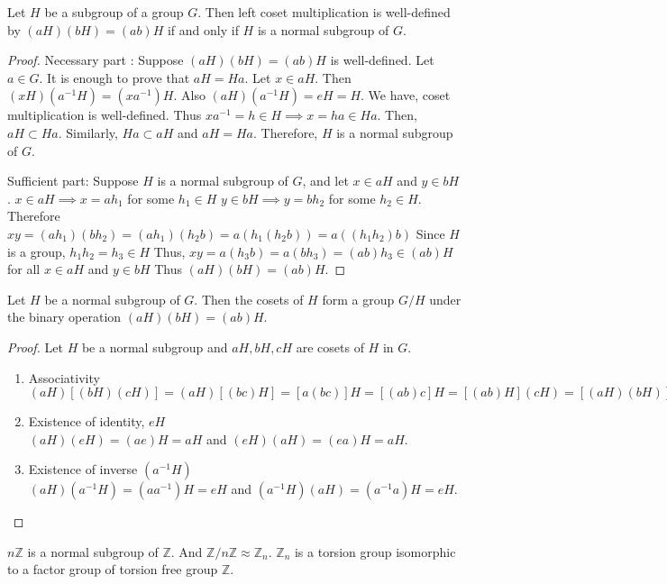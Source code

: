 \begin{theorem}
	Let $H$ be a subgroup of a group $G$.
	Then left coset multiplication is well-defined by $(aH)(bH) = (ab)H$ if and only if $H$ is a normal subgroup of $G$.
\end{theorem}
\begin{proof}
	Necessary part :
	Suppose $(aH)(bH) = (ab)H$ is well-defined.
	Let $a \in G$.
	It is enough to prove that $aH = Ha$.
	Let $x \in aH$.
	Then $(xH)(a^{-1}H) = (xa^{-1})H$.
	Also $(aH)(a^{-1}H) = eH = H$.
	We have, coset multiplication is well-defined.
	Thus $xa^{-1} = h \in H \implies x = ha \in Ha$.
	Then, $aH \subset Ha$.
	Similarly, $Ha \subset aH$ and $aH = Ha$.
	Therefore, $H$ is a normal subgroup of $G$.

	Sufficient part:
	Suppose $H$ is a normal subgroup of $G$, and let $x \in aH$ and $y \in bH$.
	$x \in aH \implies x = ah_1$ for some $h_1 \in H$
	$y \in bH \implies y = bh_2$ for some $h_2 \in H$.
	Therefore $xy = (ah_1)(bh_2) = (ah_1)(h_2b) = a(h_1(h_2b)) = a((h_1h_2)b)$
	Since $H$ is a group, $h_1h_2 = h_3 \in H$
	Thus, $xy = a(h_3b) = a(bh_3) = (ab)h_3 \in (ab)H$ for all $x \in aH$ and $y \in bH$
	Thus $(aH)(bH) = (ab)H$.
\end{proof}

\begin{corollary}
	Let $H$ be a normal subgroup of $G$.
	Then the cosets of $H$ form a group $G/H$ under the binary operation $(aH)(bH) = (ab)H$.
\end{corollary}
\begin{proof}
	Let $H$ be a normal subgroup and $aH,bH,cH$ are cosets of $H$ in $G$.
	\begin{enumerate}[label=G\arabic*]
		\item Associativity\\
			$(aH)[(bH)(cH)] = (aH)[(bc)H] = [a(bc)]H = [(ab)c]H = [(ab)H](cH) = [(aH)(bH)](cH)$
		\item Existence of identity, $eH$\\
			$(aH)(eH) = (ae)H = aH$ and $(eH)(aH) = (ea)H = aH$.
		\item Existence of inverse $(a^{-1}H)$\\
			$(aH)(a^{-1}H) = (aa^{-1})H = eH$ and $(a^{-1}H)(aH) = (a^{-1}a)H = eH$.
	\end{enumerate}
\end{proof}

\begin{remark}
	$n\mathbb{Z}$ is a normal subgroup of $\mathbb{Z}$.
	And $\mathbb{Z}/n\mathbb{Z} \approx \mathbb{Z}_n$.
	$\mathbb{Z}_n$ is a torsion group isomorphic to a factor group of torsion free group $\mathbb{Z}$.
\end{remark}

